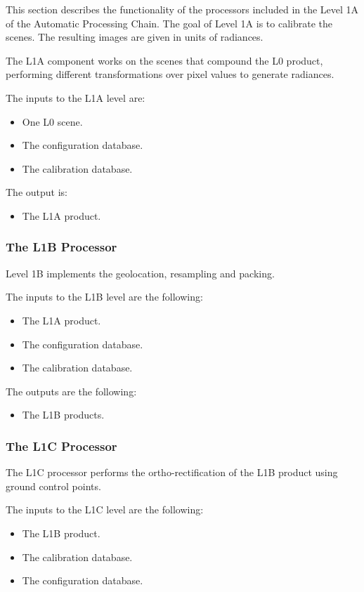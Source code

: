This section describes the functionality of the processors included in the Level 1A of the Automatic Processing Chain. The goal of Level 1A is to calibrate the scenes. The resulting images are given in units of radiances.

The L1A component works on the scenes that compound the L0 product, performing different transformations over pixel values to generate radiances.

The inputs to the L1A level are:
\begin{itemize}
\item One L0 scene.
\item The configuration database.
\item The calibration database.
\end{itemize}

The output is:
\begin{itemize}
\item The L1A product.
\end{itemize}

\subsubsection{The L1B Processor}
Level 1B implements the geolocation, resampling and packing.

The inputs to the L1B level are the following:
\begin{itemize}
\item The L1A product.
\item The configuration database.
\item The calibration database.
\end{itemize}

The outputs are the following:
\begin{itemize}
\item The L1B products.
\end{itemize}


\subsubsection{The L1C Processor}

The L1C processor performs the ortho-rectification of the L1B product using ground control points.

The inputs to the L1C level are the following:
\begin{itemize}
\item The L1B  product.
\item The calibration database.
\item The configuration database.
\end{itemize}

